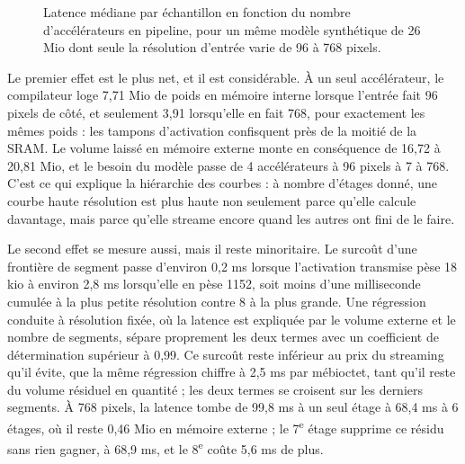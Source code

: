 \documentclass[11pt,a4paper]{report}
\begin{document}
\begin{figure}[H]
    \centering
    
    \caption[Latence contre nombre d'accélérateurs, par résolution d'entrée]{Latence médiane par échantillon en fonction du nombre d'accélérateurs en pipeline, pour un même modèle synthétique de 26 Mio dont seule la résolution d'entrée varie de 96 à 768 pixels.}
    \label{fig:latency_vs_n}
\end{figure}

Le premier effet est le plus net, et il est considérable. À un seul accélérateur, le compilateur loge 7,71 Mio de poids en mémoire interne lorsque l'entrée fait 96 pixels de côté, et seulement 3,91 lorsqu'elle en fait 768, pour exactement les mêmes poids : les tampons d'activation confisquent près de la moitié de la SRAM. Le volume laissé en mémoire externe monte en conséquence de 16,72 à 20,81 Mio, et le besoin du modèle passe de 4 accélérateurs à 96 pixels à 7 à 768. C'est ce qui explique la hiérarchie des courbes : à nombre d'étages donné, une courbe haute résolution est plus haute non seulement parce qu'elle calcule davantage, mais parce qu'elle streame encore quand les autres ont fini de le faire.

Le second effet se mesure aussi, mais il reste minoritaire. Le surcoût d'une frontière de segment passe d'environ 0,2 ms lorsque l'activation transmise pèse 18 kio à environ 2,8 ms lorsqu'elle en pèse 1152, soit moins d'une milliseconde cumulée à la plus petite résolution contre 8 à la plus grande. Une régression conduite à résolution fixée, où la latence est expliquée par le volume externe et le nombre de segments, sépare proprement les deux termes avec un coefficient de détermination supérieur à 0,99. Ce surcoût reste inférieur au prix du streaming qu'il évite, que la même régression chiffre à 2,5 ms par mébioctet, tant qu'il reste du volume résiduel en quantité ; les deux termes se croisent sur les derniers segments. À 768 pixels, la latence tombe de 99,8 ms à un seul étage à 68,4 ms à 6 étages, où il reste 0,46 Mio en mémoire externe ; le 7\textsuperscript{e} étage supprime ce résidu sans rien gagner, à 68,9 ms, et le 8\textsuperscript{e} coûte 5,6 ms de plus.
\end{document}
